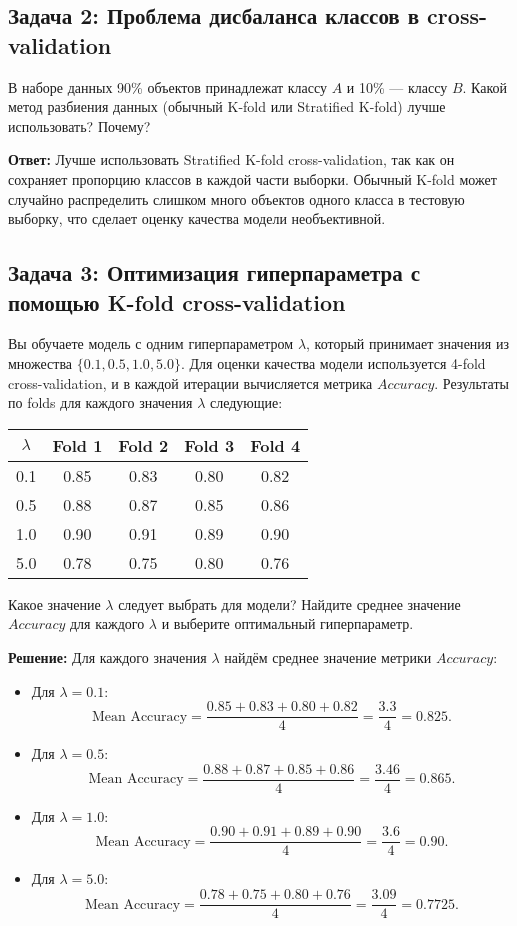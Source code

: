 \subsection*{Задача 2: Проблема дисбаланса классов в cross-validation}
В наборе данных 90\% объектов принадлежат классу $A$ и 10\% — классу $B$. Какой метод разбиения данных (обычный K-fold или Stratified K-fold) лучше использовать? Почему?

\textbf{Ответ:}
Лучше использовать Stratified K-fold cross-validation, так как он сохраняет пропорцию классов в каждой части выборки. Обычный K-fold может случайно распределить слишком много объектов одного класса в тестовую выборку, что сделает оценку качества модели необъективной.

\subsection*{Задача 3: Оптимизация гиперпараметра с помощью K-fold cross-validation}
Вы обучаете модель с одним гиперпараметром $\lambda$, который принимает значения из множества $\{0.1, 0.5, 1.0, 5.0\}$. Для оценки качества модели используется 4-fold cross-validation, и в каждой итерации вычисляется метрика $Accuracy$. Результаты по folds для каждого значения $\lambda$ следующие:

\begin{tabular}{|c|c|c|c|c|}
\hline
$\lambda$ & Fold 1 & Fold 2 & Fold 3 & Fold 4 \\ \hline
0.1       & 0.85   & 0.83   & 0.80   & 0.82   \\ \hline
0.5       & 0.88   & 0.87   & 0.85   & 0.86   \\ \hline
1.0       & 0.90   & 0.91   & 0.89   & 0.90   \\ \hline
5.0       & 0.78   & 0.75   & 0.80   & 0.76   \\ \hline
\end{tabular}

Какое значение $\lambda$ следует выбрать для модели? Найдите среднее значение $Accuracy$ для каждого $\lambda$ и выберите оптимальный гиперпараметр.

\textbf{Решение:}
Для каждого значения $\lambda$ найдём среднее значение метрики $Accuracy$:
\begin{itemize}
    \item Для $\lambda = 0.1$:
    \[
    \text{Mean Accuracy} = \frac{0.85 + 0.83 + 0.80 + 0.82}{4} = \frac{3.3}{4} = 0.825.
    \]
    \item Для $\lambda = 0.5$:
    \[
    \text{Mean Accuracy} = \frac{0.88 + 0.87 + 0.85 + 0.86}{4} = \frac{3.46}{4} = 0.865.
    \]
    \item Для $\lambda = 1.0$:
    \[
    \text{Mean Accuracy} = \frac{0.90 + 0.91 + 0.89 + 0.90}{4} = \frac{3.6}{4} = 0.90.
    \]
    \item Для $\lambda = 5.0$:
    \[
    \text{Mean Accuracy} = \frac{0.78 + 0.75 + 0.80 + 0.76}{4} = \frac{3.09}{4} = 0.7725.
    \]
\end{itemize}

